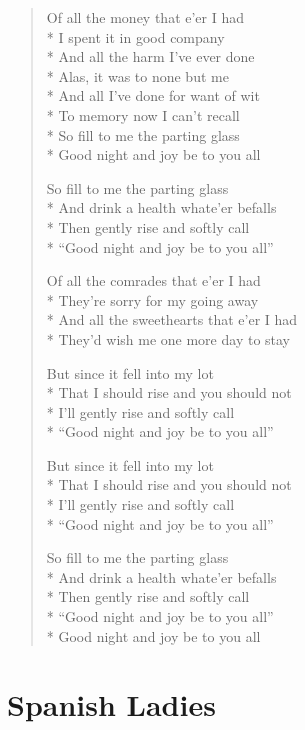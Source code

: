 \documentclass[9pt,twoside]{extarticle}
\newenvironment{xverse}{
	\begin{verse}
	\fontsize{8.5}{10.5}\selectfont
	}
	{
	\end{verse}
	\penalty 0
}
\begin{document}
\begin{xverse}
Of all the money that e’er I had \\*
I spent it in good company \\*
And all the harm I’ve ever done \\*
Alas, it was to none but me \\*
And all I’ve done for want of wit \\*
To memory now I can’t recall \\*
So fill to me the parting glass \\*
Good night and joy be to you all

So fill to me the parting glass \\*
And drink a health whate’er befalls \\*
Then gently rise and softly call \\*
“Good night and joy be to you all”

Of all the comrades that e’er I had \\*
They’re sorry for my going away \\*
And all the sweethearts that e’er I had \\*
They’d wish me one more day to stay

But since it fell into my lot \\*
That I should rise and you should not \\*
I’ll gently rise and softly call \\*
“Good night and joy be to you all”

But since it fell into my lot \\*
That I should rise and you should not \\*
I’ll gently rise and softly call \\*
“Good night and joy be to you all”

So fill to me the parting glass \\*
And drink a health whate’er befalls \\*
Then gently rise and softly call \\*
“Good night and joy be to you all” \\*
Good night and joy be to you all
\end{xverse}

\section{Spanish Ladies}
\end{document}
